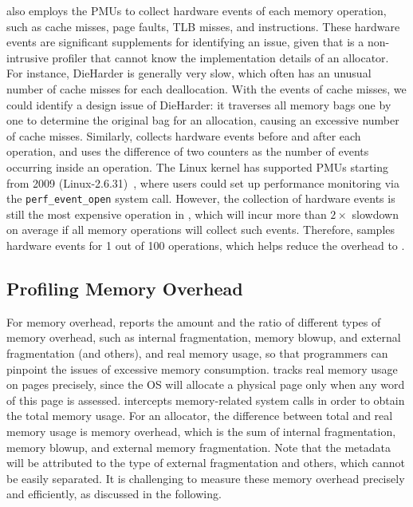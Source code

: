 \MP{} also employs the PMUs to collect hardware events of each memory operation, such as cache misses, page faults, TLB misses, and instructions. These hardware events are  significant supplements for identifying an issue, given that \MP{} is a non-intrusive profiler that cannot know the implementation details of an allocator. For instance, DieHarder is generally very slow, which often has an unusual number of cache misses for each deallocation. With the events of cache misses, we could identify a design issue of DieHarder: it traverses all memory bags one by one to determine the original bag for an allocation, causing an excessive number of cache misses. Similarly, \MP{} collects hardware events before and after each operation, and uses the difference of two counters as the number of events occurring inside an operation. The Linux kernel has supported PMUs starting from 2009 (Linux-2.6.31)~\cite{pmulinuxsupport}, where users could set up performance monitoring via the \texttt{perf\_event\_open} system call. However, the collection of hardware events is still the most expensive operation in \MP{}, which will incur more than $2\times$ slowdown on average if all memory operations will collect such events. Therefore, \MP{} samples hardware events for 1 out of 100 operations, which helps reduce the overhead to .  


\subsection{Profiling Memory Overhead}
\label{sec:profilingmemory}

For memory overhead, \MP{} reports the amount and the ratio of different types of memory overhead, such as internal fragmentation, memory blowup, and external fragmentation (and others), and real memory usage, so that programmers can pinpoint the issues of excessive memory consumption. \MP{} tracks real memory usage on pages precisely, since the OS will allocate a physical page only when any word of this page is assessed. \MP{} intercepts memory-related system calls in order to obtain the total memory usage. For an allocator, the difference between total and real memory usage is memory overhead, which is the sum of internal fragmentation, memory blowup, and external memory fragmentation. Note that the metadata will be attributed to the type of external fragmentation and others, which cannot be easily separated. It is challenging to measure these memory overhead precisely and efficiently, as discussed in the following. 


